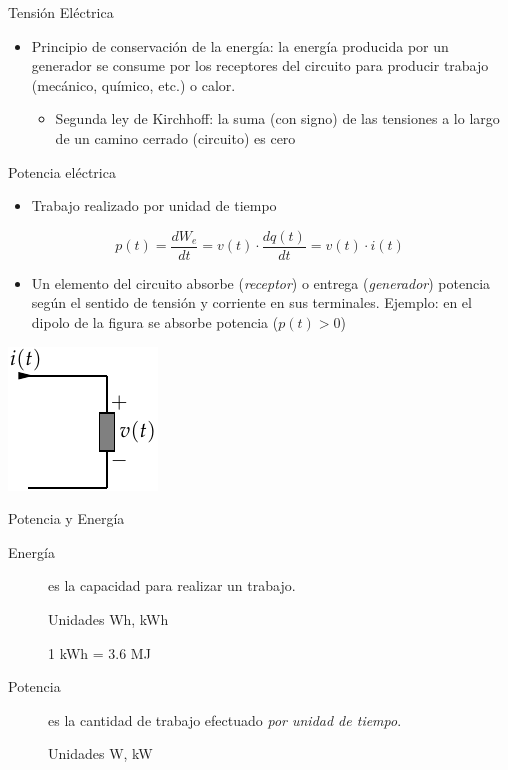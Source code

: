 \documentclass[xcolor={usenames,svgnames,dvipsnames}]{beamer}
\begin{document}
\begin{frame}[label={sec:orgf6017ec}]{Tensión Eléctrica}
\begin{itemize}
\item \alert{Principio de conservación de la energía}: la energía producida por
un generador se consume por los receptores del circuito para producir
trabajo (mecánico, químico, etc.) o calor.

\begin{itemize}
\item Segunda ley de Kirchhoff: la suma (con signo) de las tensiones a
lo largo de un camino cerrado (circuito) es cero
\end{itemize}
\end{itemize}
\end{frame}


\begin{frame}[label={sec:org66869f1}]{Potencia eléctrica}
\begin{itemize}
\item Trabajo realizado por unidad de tiempo
\end{itemize}
\[
p(t)=\frac{dW_{e}}{dt}=v(t)\cdot\frac{dq(t)}{dt}=v(t)\cdot i(t)
\]

\begin{itemize}
\item Un elemento del circuito absorbe (\emph{receptor}) o entrega
(\emph{generador}) potencia según el sentido de tensión y corriente en
sus terminales. Ejemplo: en el dipolo de la figura se absorbe
potencia (\(p(t)>0\))
\end{itemize}
\begin{center}
\includegraphics[height=0.5\textheight]{../figs/ReceptorPasivo.pdf}
\end{center}
\end{frame}

\begin{frame}[label={sec:org14f8314}]{Potencia y Energía}
\begin{description}
\item[{Energía}] es la capacidad para realizar un trabajo.

Unidades Wh, kWh

1 kWh = 3.6 MJ

\item[{Potencia}] es la cantidad de trabajo efectuado \emph{por unidad de
tiempo}.

Unidades W, kW
\end{description}
\end{frame}
\end{document}
